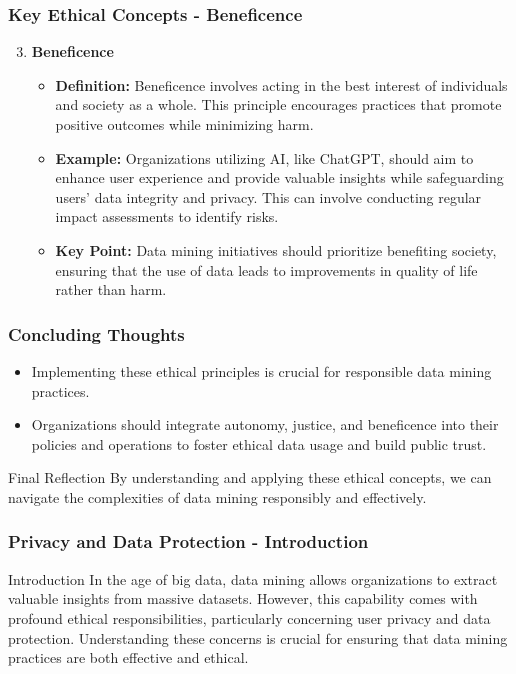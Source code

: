 \documentclass[aspectratio=169]{beamer}
\begin{document}
\begin{frame}[fragile]
    \frametitle{Key Ethical Concepts - Beneficence}
    \begin{enumerate}
        \setcounter{enumi}{2}  %
        \item \textbf{Beneficence}
            \begin{itemize}
                \item \textbf{Definition:} Beneficence involves acting in the best interest of individuals and society as a whole. This principle encourages practices that promote positive outcomes while minimizing harm.
                \item \textbf{Example:} Organizations utilizing AI, like ChatGPT, should aim to enhance user experience and provide valuable insights while safeguarding users' data integrity and privacy. This can involve conducting regular impact assessments to identify risks.
                \item \textbf{Key Point:} Data mining initiatives should prioritize benefiting society, ensuring that the use of data leads to improvements in quality of life rather than harm.
            \end{itemize}
    \end{enumerate}
\end{frame}

\begin{frame}[fragile]
    \frametitle{Concluding Thoughts}
    \begin{itemize}
        \item Implementing these ethical principles is crucial for responsible data mining practices.
        \item Organizations should integrate autonomy, justice, and beneficence into their policies and operations to foster ethical data usage and build public trust.
    \end{itemize}
    \begin{block}{Final Reflection}
        By understanding and applying these ethical concepts, we can navigate the complexities of data mining responsibly and effectively.
    \end{block}
\end{frame}

\begin{frame}[fragile]
    \frametitle{Privacy and Data Protection - Introduction}
    \begin{block}{Introduction}
        In the age of big data, data mining allows organizations to extract valuable insights from massive datasets. However, this capability comes with profound ethical responsibilities, particularly concerning user privacy and data protection. 
        Understanding these concerns is crucial for ensuring that data mining practices are both effective and ethical.
    \end{block}
\end{frame}
\end{document}
